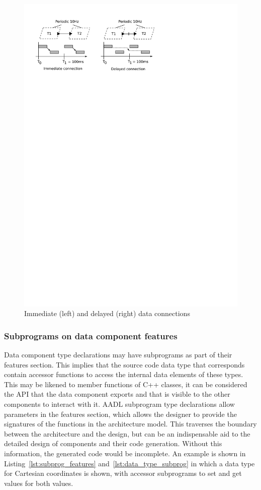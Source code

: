 \begin{figure}
\centering
\includegraphics[scale=0.75]{figs/conn_semantics}
\caption{Immediate (left) and delayed (right) data connections}
\label{fig:conn_semantics}
\end{figure}

\subsubsection{Subprograms on data component features}
Data component type declarations may have subprograms as part of their
features section. This implies that the source code data type that
corresponds contain accessor functions to access the internal data
elements of these types. This may be likened to member functions of
C++ classes, it can be considered the API that the data component
exports and that is visible to the other components to interact with
it. AADL subprogram type declarations allow parameters in the features
section, which allows the designer to provide the signatures of the
functions in the architecture model. This traverses the boundary
between the architecture and the design, but can be an indispensable
aid to the detailed design of components and their code
generation. Without this information, the generated code would be
incomplete. An example is shown in Listing~\ref{lst:subprog_features}
and~\ref{lst:data_type_subprog} in which a data type for Cartesian
coordinates is shown, with accessor subprograms to set and get values
for both values.

